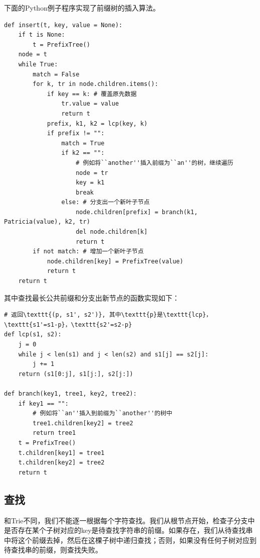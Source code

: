\documentclass[b5paper]{ctexart}
\begin{document}
下面的Python例子程序实现了前缀树的插入算法。

\lstset{language=Python}
\begin{lstlisting}
def insert(t, key, value = None):
    if t is None:
        t = PrefixTree()
    node = t
    while True:
        match = False
        for k, tr in node.children.items():
            if key == k: # 覆盖原先数据
                tr.value = value
                return t
            prefix, k1, k2 = lcp(key, k)
            if prefix != "":
                match = True
                if k2 == "":
                    # 例如将``another''插入前缀为``an''的树，继续遍历
                    node = tr
                    key = k1
                    break
                else: # 分支出一个新叶子节点
                    node.children[prefix] = branch(k1, Patricia(value), k2, tr)
                    del node.children[k]
                    return t
        if not match: # 增加一个新叶子节点
            node.children[key] = PrefixTree(value)
            return t
    return t
\end{lstlisting}

其中查找最长公共前缀和分支出新节点的函数实现如下：

\begin{lstlisting}
# 返回\texttt{(p, s1', s2')}, 其中\texttt{p}是\texttt{lcp}，\texttt{s1'=s1-p}，\texttt{s2'=s2-p}
def lcp(s1, s2):
    j = 0
    while j < len(s1) and j < len(s2) and s1[j] == s2[j]:
        j += 1
    return (s1[0:j], s1[j:], s2[j:])

def branch(key1, tree1, key2, tree2):
    if key1 == "":
        # 例如将``an''插入到前缀为``another''的树中
        tree1.children[key2] = tree2
        return tree1
    t = PrefixTree()
    t.children[key1] = tree1
    t.children[key2] = tree2
    return t
\end{lstlisting}


\subsection{查找}

和Trie不同，我们不能逐一根据每个字符查找。我们从根节点开始，检查子分支中是否存在某个子树对应的key是待查找字符串的前缀。如果存在，我们从待查找串中将这个前缀去掉，然后在这棵子树中递归查找；否则，如果没有任何子树对应到待查找串的前缀，则查找失败。
\end{document}
